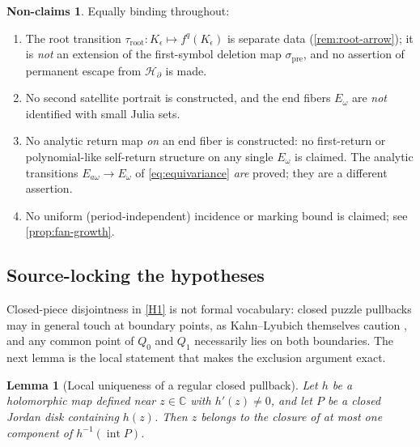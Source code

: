 \documentclass[11pt,reqno]{amsart}
\numberwithin{equation}{section}
\theoremstyle{plain}
\newtheorem{lemma}[theorem]{Lemma}
\theoremstyle{definition}
\newtheorem{nonclaims}[theorem]{Non-claims}
\theoremstyle{remark}
\newcommand{\C}{\mathbb C}
\newcommand{\HB}{\mathcal H_\partial}
\newcommand{\spre}{\sigma_{\mathrm{pre}}}
\newcommand{\troot}{\tau_{\mathrm{root}}}
\newcommand{\rootK}{K_{\epsilon}}
\begin{document}
\begin{nonclaims}
\label{nonclaims:main}
Equally binding throughout:
\begin{enumerate}[label=\textup{(N\arabic*)},leftmargin=3.2em]
 \item \label{N1} The root transition
  $\troot\colon\rootK\mapsto f^q(\rootK)$ is separate data
  (\cref{rem:root-arrow}); it is \emph{not} an extension of the
  first-symbol deletion map $\spre$, and no assertion of permanent
  escape from $\HB$ is made.
 \item \label{N2} No second satellite portrait is constructed, and the
  end fibers $E_\omega$ are \emph{not} identified with small Julia sets.
 \item \label{N3} No analytic return map \emph{on} an end fiber is
  constructed: no first-return or polynomial-like self-return structure
  on any single $E_\omega$ is claimed.  The analytic transitions
  $E_{a\omega}\to E_\omega$ of \eqref{eq:equivariance} \emph{are}
  proved; they are a different assertion.
 \item \label{N4} No uniform (period-independent) incidence or marking
  bound is claimed; see \cref{prop:fan-growth}.
\end{enumerate}
\end{nonclaims}

\subsection{Source-locking the hypotheses}

Closed-piece disjointness in \ref{H1} is not formal vocabulary: closed
puzzle pullbacks may in general touch at boundary points, as
Kahn--Lyubich themselves caution \cite{KLDecorations08}, and any common
point of $Q_0$ and $Q_1$ necessarily lies on both boundaries.  The next
lemma is the local statement that makes the exclusion argument exact.

\begin{lemma}[Local uniqueness of a regular closed pullback]
\label{lem:local-pullback}
Let $h$ be a holomorphic map defined near $z\in\C$ with $h'(z)\ne0$, and
let $P$ be a closed Jordan disk containing $h(z)$.  Then $z$ belongs to
the closure of at most one component of $h^{-1}(\operatorname{int}P)$.
\end{lemma}
\end{document}
